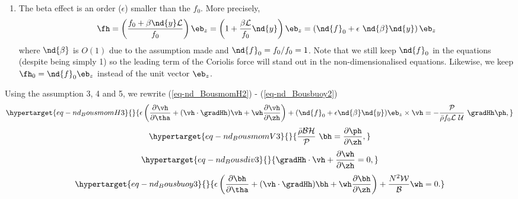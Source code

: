 \documentclass[
  letterpaper,
  twocolumn,
  landscape]{report}
\begin{document}
\begin{enumerate}
  simply keeping the problem in more general form by allowing
  \(\partial w / \partial z\) to exist at the leading order rather than
  imposing an extra assumption. In other words, such scaling allows
  \(\mathcal{W} < \mathcal{U} \mathcal{H} / \mathcal{L}\) as the terms
  \(\partial w / \partial z\) and \(w \partial / \partial z\) may
  naturally become small or zero in the solution (our scaling does not
  prevent).
\item
  The beta effect is an order (\(\epsilon\)) smaller than the \(f_0\).
  More precisely,
  \[ \fh = \left( \frac{f_0 + \beta \nd{y} \mathcal{L}}{f_0} \right) \eb_z =  \left( 1 + \frac{\beta \mathcal{L}}{f_0} \nd{y} \right) \eb_z =  \left( \nd{f}_0 + \epsilon \ \nd{\beta} \nd{y} \right) \eb_z
  \] where \(\nd{\beta}\) is \(O(1)\) due to the assumption made and
  \(\nd{f}_0 = f_0/f_0 = 1\). Note that we still keep \(\nd{f}_0\) in
  the equations (despite being simply 1) so the leading term of the
  Coriolis force will stand out in the non-dimensionalised equations.
  Likewise, we keep \(\fh_0 = \nd{f}_0 \eb_z\) instead of the unit
  vector \(\eb_z\).
\end{enumerate}

Using the assumption 3, 4 and 5, we rewrite (\ref{eq-nd_BousmomH2}) -
(\ref{eq-nd_Bousbuoy2})
\begin{equation}\protect\hypertarget{eq-nd_BousmomH3}{}{ \epsilon \left(  \frac{\partial\vh}{\partial \tha} + (\vh \cdot \gradHh ) \vh + \wh \frac{\partial \vh }{\partial \zh} \right) +  (\nd{f}_0 + \epsilon \nd{\beta} \nd{y})  \eb_z \times \vh = - \frac{\mathcal{P}}{\bar\rho f_0 \mathcal{L}\ \mathcal{U} } \ \gradHh \ph, }\label{eq-nd_BousmomH3}\end{equation}
\begin{equation}\protect\hypertarget{eq-nd_BousmomV3}{}{ \frac{\bar\rho \mathcal{B} \mathcal{H}}{\mathcal{P}} \ \bh = \frac{\partial \ph }{\partial \zh}, }\label{eq-nd_BousmomV3}\end{equation}
\begin{equation}\protect\hypertarget{eq-nd_Bousdiv3}{}{ \gradHh \cdot\vh + \frac{\partial \wh}{\partial \zh} =0, }\label{eq-nd_Bousdiv3}\end{equation}
\begin{equation}\protect\hypertarget{eq-nd_Bousbuoy3}{}{ \epsilon \left(\frac{\partial \bh}{\partial \tha} +(\vh\cdot\gradHh ) \bh + \wh \frac{\partial \bh}{\partial \zh}  \right) + \frac{N^2 \mathcal{W}}{\mathcal{B}}\wh =0. }\label{eq-nd_Bousbuoy3}\end{equation}
\end{document}
